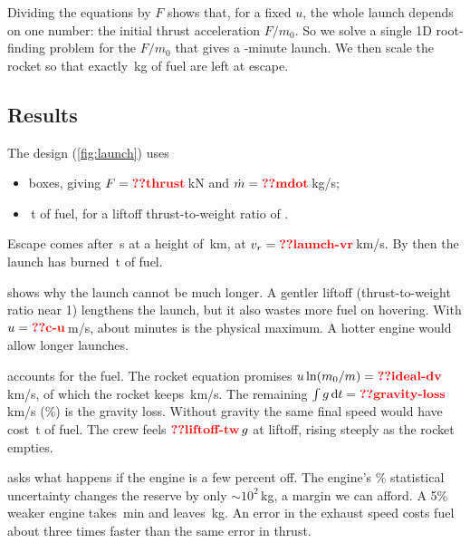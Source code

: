 \documentclass[aps,prd,twocolumn,nofootinbib,floatfix,superscriptaddress]{revtex4-2}
\begin{document}
Dividing the equations by $F$ shows that, for a fixed $u$, the whole launch depends on one number: the initial thrust acceleration $F/m_0$.
So we solve a single 1D root-finding problem for the $F/m_0$ that gives a -minute launch.
We then scale the rocket so that exactly \,kg of fuel are left at escape.

\subsection{Results}
The design (\cref{fig:launch}) uses
\begin{itemize}
\item {} boxes, giving $F=\val{thrust}$\,kN and $\dot m=\val{mdot}$\,kg/s;
\item {}\,t of fuel, for a liftoff thrust-to-weight ratio of .
\end{itemize}
Escape comes after \,s at a height of \,km, at $v_r=\val{launch-vr}$\,km/s.
By then the launch has burned \,t of fuel.

 shows why the launch cannot be much longer.
A gentler liftoff (thrust-to-weight ratio near 1) lengthens the launch, but it also wastes more fuel on hovering.
With $u=\val{c-u}$\,m/s, about  minutes is the physical maximum.
A hotter engine would allow longer launches.

 accounts for the fuel.
The rocket equation promises $u\ln(m_0/m)=\val{ideal-dv}$\,km/s, of which the rocket keeps \,km/s.
The remaining $\int g\,\dd t=\val{gravity-loss}$\,km/s (\%) is the gravity loss.
Without gravity the same final speed would have cost \,t of fuel.
The crew feels $\val{liftoff-tw}\,g$ at liftoff, rising steeply as the rocket empties.

 asks what happens if the engine is a few percent off.
The engine's \% statistical uncertainty changes the reserve by only $\sim10^2$\,kg, a margin we can afford.
A 5\% weaker engine takes \,min and leaves \,kg.
An error in the exhaust speed costs fuel about three times faster than the same error in thrust.
\end{document}
